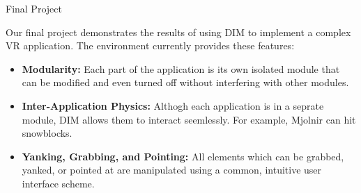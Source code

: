 \documentclass[final]{beamer}
\newlength{\onecolwid}
\begin{document}
\begin{frame}[t]
\begin{columns}[t]
            \begin{column}{\onecolwid} %

                \begin{block}{Final Project}
                    \setlength{\parskip}{0.5em}

                    Our final project demonstrates the results of using DIM to
                    implement a complex VR application. The environment
                    currently provides these features:
                    \begin{itemize}

                        \item \textbf{Modularity:} Each part of the application
                            is its own isolated module that can be modified and
                            even turned off without interfering with other
                            modules.

                        \item \textbf{Inter-Application Physics:} Althogh each
                            application is in a seprate module, DIM allows them
                            to interact seemlessly. For example, Mjolnir can hit
                            snowblocks.

                        \item \textbf{Yanking, Grabbing, and Pointing:} All
                            elements which can be grabbed, yanked, or pointed at
                            are manipulated using a common, intuitive user
                            interface scheme.

                    \end{itemize}

                \end{block}

            \end{column} %

        \end{columns} %

    \end{frame} %
\end{document}
